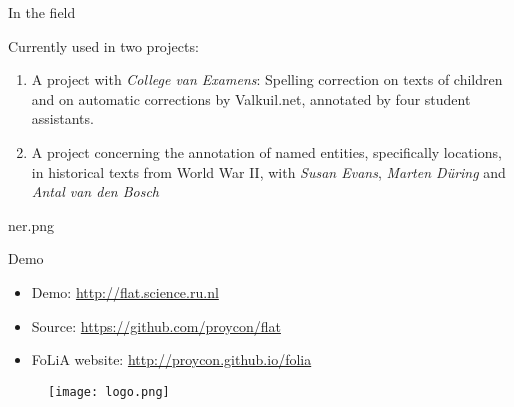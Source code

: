 \documentclass[xcolor=table,10pt,t]{beamer}
\begin{document}
\begin{frame}{In the field}
  \begin{block}{Currently used in two projects:}
    \begin{enumerate}
      \item A project with \emph{College van Examens}: Spelling correction on
        texts of children and on automatic corrections by Valkuil.net,
        annotated by four student assistants. 
      \item A project concerning the annotation of named entities, specifically
        locations, in historical texts from World War II, with \emph{Susan Evans},
        \emph{Marten Düring} and \emph{Antal van den Bosch}
    \end{enumerate}
  \end{block}
\end{frame}

\begin{tussenpagina}{ }{ }{ner.png}
\end{tussenpagina}

\begin{frame}{Demo}
  \begin{block}{}
      \begin{itemize}
        \item Demo: \url{http://flat.science.ru.nl}
        \item Source: \url{https://github.com/proycon/flat}
        \item FoLiA website: \url{http://proycon.github.io/folia}
      \end{itemize}

      \medskip
        \begin{figure}
          \texttt{[image: logo.png]}
        \end{figure}
  \end{block}
\end{frame}
\end{document}
